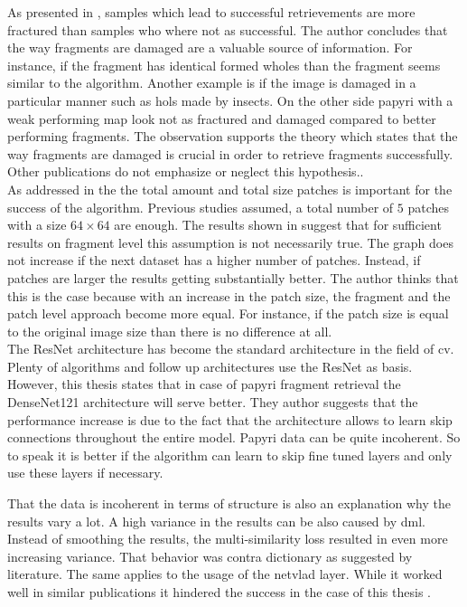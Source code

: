 \noindent As presented in , samples which lead to successful retrievements are more fractured than samples who where not as successful. The author concludes that the way fragments are damaged are a valuable source of information. For instance, if the fragment has identical formed wholes than the fragment seems similar to the algorithm. Another example is if the image is damaged in a particular manner such as hols made by insects. On the other side papyri with a weak performing \ac{map} look not as fractured and damaged compared to better performing fragments. The observation supports the theory which states that the way fragments are damaged is crucial in order to retrieve fragments successfully. Other publications do not emphasize or neglect this hypothesis.\cite{Pirrone21, Tensmeyer20}.\\

\noindent As addressed in the  the total amount and total size patches is important for the success of the algorithm. Previous studies assumed, a total number of \(5\) patches with a size \(64 \times 64\) are enough. The results shown in  suggest that for sufficient results on fragment level this assumption is not necessarily true. The graph does not increase if the next dataset has a higher number of patches. Instead, if patches are larger the results getting substantially better. The author thinks that this is the case because with an increase in the patch size, the fragment and the patch level approach become more equal. For instance, if the patch size is equal to the original image size than there is no difference at all. \\

\noindent The ResNet architecture has become the standard architecture in the field of \ac{cv}. Plenty of algorithms and follow up architectures use the ResNet as basis. However, this thesis states that in case of papyri fragment retrieval the DenseNet121 architecture will serve better. They author suggests that the performance increase is due to the fact that the architecture allows to learn skip connections throughout the entire model. Papyri data can be quite incoherent. So to speak it is better if the algorithm can learn to skip fine tuned layers and only use these layers if necessary.

\noindent That the data is incoherent in terms of structure is also an explanation why the results vary a lot. A high variance in the results can be also caused by \ac{dml}. Instead of smoothing the results, the multi-similarity loss resulted in even more increasing variance. That behavior was contra dictionary as suggested by literature\cite{wang19}. The same applies to the usage of the \ac{netvlad} layer. While it worked well in similar publications it hindered the success in the case of this thesis \cite{Arandjelovic15}. 

